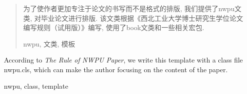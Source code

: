 %

\begin{abstract}
    为了使作者更加专注于论文的书写而不是格式的排版, 我们提供了nwpu文类, 对毕业论文进行排版. 该文类根据《西北工业大学博士研究生学位论文编写规则（试用版）》编写, 使用了book文类和一些相关宏包.
    \begin{keyword}
        nwpu,  文类, 模板
    \end{keyword}
\end{abstract}

\begin{abstractE}
    According to {\it The Rule of NWPU Paper}, we write this template with a class file nwpu.cls, which can make the author focusing on the content of the paper.
    \begin{keywordE}
        nwpu, class, template
    \end{keywordE}
\end{abstractE}